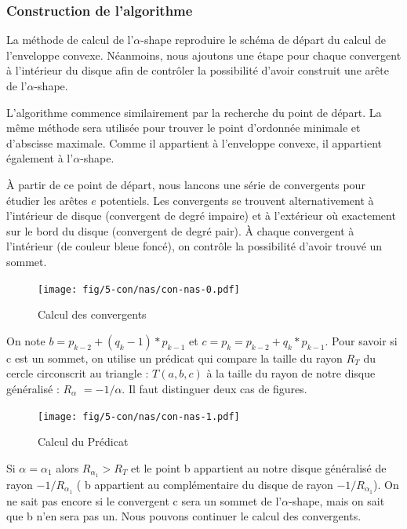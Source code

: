 \subsubsection{Construction de l'algorithme}

La méthode de calcul de l'$\alpha$-shape reproduire le schéma de départ du calcul de l’enveloppe convexe. Néanmoins, nous ajoutons une étape pour chaque convergent à l'intérieur du disque afin de contrôler la possibilité d'avoir construit une arête de l'$\alpha$-shape.

L'algorithme commence similairement par la recherche du point de départ. La même méthode sera utilisée pour trouver le point d'ordonnée minimale et d'abscisse maximale. Comme il appartient à l'enveloppe convexe, il appartient également à l'$\alpha$-shape.

À partir de ce point de départ, nous lancons une série de convergents pour étudier les arêtes $e$ potentiels. Les convergents se trouvent alternativement à l'intérieur de disque (convergent de degré impaire) et à l'extérieur où exactement sur le bord du disque (convergent de degré pair). À chaque convergent à l'intérieur (de couleur bleue foncé), on contrôle la possibilité d'avoir trouvé un sommet.

\begin{figure}[H]
  \centering
  \texttt{[image: fig/5-con/nas/con-nas-0.pdf]}
  \caption{Calcul des convergents}
\end{figure}

On note $b = p_{k-2} + (q_k - 1) * p_{k-1}$ et $c = p_k = p_{k-2} + q_k * p_{k-1}$. Pour savoir si c est un sommet, on utilise un prédicat qui compare la taille du rayon \textbf{$R_T$} du cercle circonscrit au triangle : $T(a, b, c)$ à la taille du rayon de notre disque généralisé : \textbf{$R_{\alpha}$} $= -1/\alpha$. Il faut distinguer deux cas de figures.\\

\begin{figure}[H]
  \centering
  \texttt{[image: fig/5-con/nas/con-nas-1.pdf]}
  \caption{Calcul du Prédicat}
\end{figure}

Si $\alpha = \alpha_{1}$ alors \textbf{$R_{\alpha_{1}} > R_T$} et le point b appartient au notre disque généralisé de rayon $-1/R_{\alpha_{1}}$ ( b appartient au complémentaire du disque de rayon $-1/R_{\alpha_{1}}$). On ne sait pas encore si le convergent c sera un sommet de l'$\alpha$-shape, mais on sait que b n'en sera pas un. Nous pouvons continuer le calcul des convergents.\\ 


